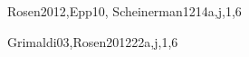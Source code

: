 \begin{syllabus}
\begin{unit}{\DSProofTechniques}{}{Rosen2012,Epp10, Scheinerman12}{14}{a,j,1,6}
\begin{learningoutcomes}
	\item \DSProofTechniquesLOIdentifyTheUsed [\Assessment]
	\item \DSProofTechniquesLOOutline [\Usage ]
	\item \DSProofTechniquesLOApplyEach [\Usage ]
	\item \DSProofTechniquesLODetermineWhich [\Assessment]
	\item \DSProofTechniquesLOExplainTheIdeas [\Familiarity ]
	\item \DSProofTechniquesLOExplainTheWeak [\Assessment]
	\item \DSProofTechniquesLOStateThe [\Familiarity]
\end{learningoutcomes}
\end{unit}

\begin{unit}{\DSSetsRelationsandFunctions}{}{}{Grimaldi03,Rosen2012}{22}{a,j,1,6}
   \begin{topics}
        \item \DSSetsRelationsandFunctionsTopicSets
         \item \DSSetsRelationsandFunctionsTopicRelations
         \item \DSSetsRelationsandFunctionsTopicFunctions
   \end{topics}
   \begin{learningoutcomes}
	\item \DSSetsRelationsandFunctionsLOExplainWith [\Assessment]
	\item \DSSetsRelationsandFunctionsLOPerformThe [\Assessment]
	\item \DSSetsRelationsandFunctionsLORelate [\Assessment]
   \end{learningoutcomes}
\end{unit}
 


\end{syllabus}
